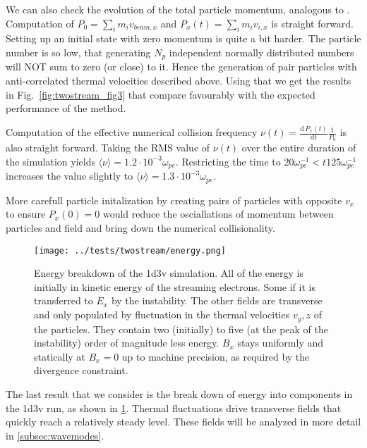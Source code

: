\documentclass[%
preprint,
amsmath,amssymb,
aps,
]{revtex4-2}
\begin{document}
We can also check the evolution of the total particle momentum, analogous to
\cite[Fig. 3]{LAPENTA2017349}. Computation of $P_0 = \sum_i m_i v_{beam,x}$ and
$P_x(t) = \sum_i m_i v_{i,x}$ is straight forward. Setting up an initial state
with zero momentum is quite a bit harder. The particle number is so low, that
generating $N_p$ independent normally distributed numbers will NOT sum to zero
(or close) to it. Hence the generation of pair particles with anti-correlated
thermal velocities described above. Using that we get the results in
Fig.~\ref{fig:twostream_fig3} that compare favourably with the expected
performance of the method.

Computation of the effective numerical collision frequency $\nu(t) =
\frac{\mathrm{d}\,P_x(t)}{\mathrm{d}t}\frac{1}{P_0}$ is also straight forward.
Taking the RMS value of $\nu(t)$ over the entire duration of the simulation
yields $\langle \nu \rangle = 1.2\cdot10^{-3}\omega_{pe}$. Restricting the time
to $20 \omega_{pe}^{-1} < t 125 \omega_{pe}^{-1}$ increases the value slightly
to $\langle \nu \rangle = 1.3\cdot10^{-3}\omega_{pe}$.

More carefull particle initalization by creating pairs of particles with
opposite $v_x$ to ensure $P_x(0) = 0$ would reduce the osciallations of
momentum between particles and field and bring down the numerical
collisionality.

\begin{figure}
    \centering
    \texttt{[image: ../tests/twostream/energy.png]}
    \caption{Energy breakdown of the 1d3v simulation. All of the energy is initially in kinetic energy of the streaming electrons. Some if it is transferred to $E_x$ by the instability. The other fields are transverse and only populated by fluctuation in the thermal velocities $v_y,z$ of the particles. They contain two (initially) to five (at the peak of the instability) order of magnitude less energy. $B_x$ stays uniformly and statically at $B_x = 0$ up to machine precision, as required by the divergence constraint.}
    \label{fig:twostream_energy}
\end{figure}

The last result that we consider is the break down of energy into components in
the 1d3v run, as shown in \ref{fig:twostream_energy}. Thermal fluctuations
drive transverse fields that quickly reach a relatively steady level. These
fields will be analyzed in more detail in \ref{subsec:wavemodes}.

\FloatBarrier
\end{document}
